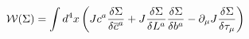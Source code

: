 \begin{equation}
\mathcal{W}(\Sigma )=\int d^{4}x\left( Jc^{a}\frac{\delta \Sigma }{\delta
\overline{c}^{a}}+J\frac{\delta \Sigma }{\delta L^{a}}\frac{\delta \Sigma }{%
\delta b^{a}}-\partial _{\mu }J\frac{\delta \Sigma }{\delta \tau _{\mu }}%
\right)  \label{dio}
\end{equation}

